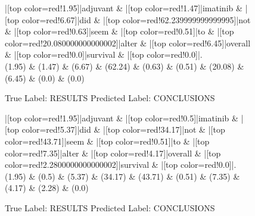 \documentclass[a4paper, landscape]{article}
\begin{document}
\begin{figure}
\begin{center}
\begin{dependency}
\begin{deptext}
|[top color=red!1.95]|adjuvant \& |[top color=red!1.47]|imatinib \& |[top color=red!6.67]|did \& |[top color=red!62.239999999999995]|not \& |[top color=red!0.63]|seem \& |[top color=red!0.51]|to \& |[top color=red!20.080000000000002]|alter \& |[top color=red!6.45]|overall \& |[top color=red!0.0]|survival \& |[top color=red!0.0]|.\\
(1.95) \& (1.47) \& (6.67) \& (62.24) \& (0.63) \& (0.51) \& (20.08) \& (6.45) \& (0.0) \& (0.0)\\
\end{deptext}
\end{dependency}
\end{center}
\caption{True Label: RESULTS Predicted Label: CONCLUSIONS}
\end{figure}
\clearpage
\begin{figure}
\begin{center}
\begin{dependency}
\begin{deptext}
|[top color=red!1.95]|adjuvant \& |[top color=red!0.5]|imatinib \& |[top color=red!5.37]|did \& |[top color=red!34.17]|not \& |[top color=red!43.71]|seem \& |[top color=red!0.51]|to \& |[top color=red!7.35]|alter \& |[top color=red!4.17]|overall \& |[top color=red!2.2800000000000002]|survival \& |[top color=red!0.0]|.\\
(1.95) \& (0.5) \& (5.37) \& (34.17) \& (43.71) \& (0.51) \& (7.35) \& (4.17) \& (2.28) \& (0.0)\\
\end{deptext}
\end{dependency}
\end{center}
\caption{True Label: RESULTS Predicted Label: CONCLUSIONS}
\end{figure}
\clearpage
\end{document}
